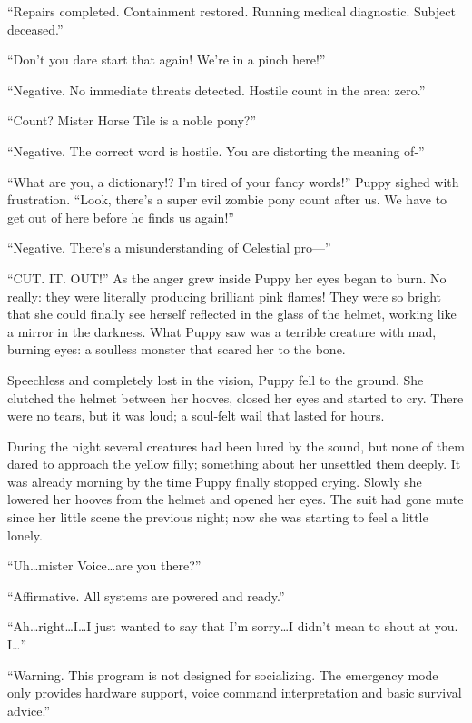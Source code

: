 ``{\mt Repairs completed. Containment restored. Running medical diagnostic. Subject deceased.}''

``Don't you dare start that again! We're in a pinch here!''

``{\mt Negative. No immediate threats detected. Hostile count in the area: zero.}''

``Count? Mister Horse Tile is a noble pony?''

``{\mt Negative. The correct word is hostile. You are distorting the meaning of-}''

``What are you, a dictionary!? I'm tired of your fancy words!'' Puppy sighed with frustration. ``Look, there's a super evil zombie pony count after us. We have to get out of here before he finds us again!''

``{\mt Negative. There's a misunderstanding of Celestial pro---}''

``CUT. IT. OUT!'' As the anger grew inside Puppy her eyes began to burn. No really: they were literally producing brilliant pink flames! They were so bright that she could finally see herself reflected in the glass of the helmet, working like a mirror in the darkness. What Puppy saw was a terrible creature with mad, burning eyes: a soulless monster that scared her to the bone.

Speechless and completely lost in the vision, Puppy fell to the ground. She clutched the helmet between her hooves, closed her eyes and started to cry. There were no tears, but it was loud; a soul-felt wail that lasted for hours.

\horizonline


During the night several creatures had been lured by the sound, but none of them dared to approach the yellow filly; something about her unsettled them deeply. It was already morning by the time Puppy finally stopped crying. Slowly she lowered her hooves from the helmet and opened her eyes. The suit had gone mute since her little scene the previous night; now she was starting to feel a little lonely.

``Uh\dots mister Voice\dots are you there?''

``{\mt Affirmative. All systems are powered and ready.}''

``Ah\dots right\dots I\dots I just wanted to say that I'm sorry\dots I didn't mean to shout at you. I\dots''

``{\mt Warning. This program is not designed for socializing. The emergency mode only provides hardware support, voice command interpretation and basic survival advice.}''

